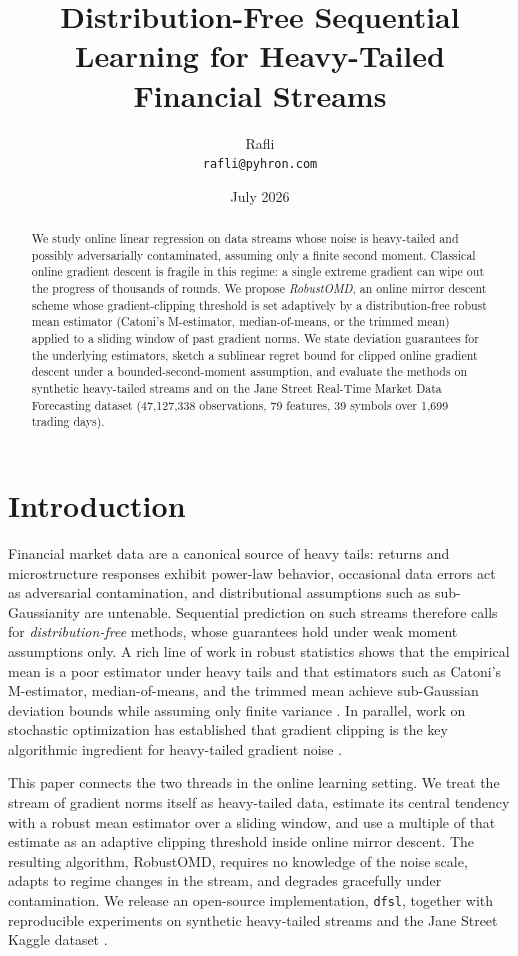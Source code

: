 \documentclass[11pt]{article}
\title{Distribution-Free Sequential Learning for Heavy-Tailed Financial Streams}
\author{Rafli\\ \texttt{rafli@pyhron.com}}
\date{July 2026}
\begin{document}
\maketitle

\begin{abstract}
We study online linear regression on data streams whose noise is heavy-tailed and
possibly adversarially contaminated, assuming only a finite second moment. Classical
online gradient descent is fragile in this regime: a single extreme gradient can wipe out
the progress of thousands of rounds. We propose \emph{RobustOMD}, an online mirror
descent scheme whose gradient-clipping threshold is set adaptively by a distribution-free
robust mean estimator (Catoni's M-estimator, median-of-means, or the trimmed mean)
applied to a sliding window of past gradient norms. We state deviation guarantees for the
underlying estimators, sketch a sublinear regret bound for clipped online gradient
descent under a bounded-second-moment assumption, and evaluate the methods on synthetic
heavy-tailed streams and on the Jane Street Real-Time Market Data Forecasting dataset
(47{,}127{,}338 observations, 79 features, 39 symbols over 1{,}699 trading days).
\end{abstract}

\section{Introduction}

Financial market data are a canonical source of heavy tails: returns and microstructure
responses exhibit power-law behavior, occasional data errors act as adversarial
contamination, and distributional assumptions such as sub-Gaussianity are untenable.
Sequential prediction on such streams therefore calls for \emph{distribution-free}
methods, whose guarantees hold under weak moment assumptions only. A rich line of work
in robust statistics shows that the empirical mean is a poor estimator under heavy tails
and that estimators such as Catoni's M-estimator, median-of-means, and the trimmed mean
achieve sub-Gaussian deviation bounds while assuming only finite variance
\citep{catoni2012challenging,devroye2016sub,lugosi2019mean}. In parallel, work on
stochastic optimization has established that gradient clipping is the key algorithmic
ingredient for heavy-tailed gradient noise
\citep{zhang2020adaptive,cutkosky2021high}.

This paper connects the two threads in the online learning setting. We treat the stream
of gradient norms itself as heavy-tailed data, estimate its central tendency with a
robust mean estimator over a sliding window, and use a multiple of that estimate as an
adaptive clipping threshold inside online mirror descent. The resulting algorithm,
RobustOMD, requires no knowledge of the noise scale, adapts to regime changes in the
stream, and degrades gracefully under contamination. We release an open-source
implementation, \texttt{dfsl}, together with reproducible experiments on synthetic
heavy-tailed streams and the Jane Street Kaggle dataset
\citep{janestreet2024kaggle}.
\end{document}
